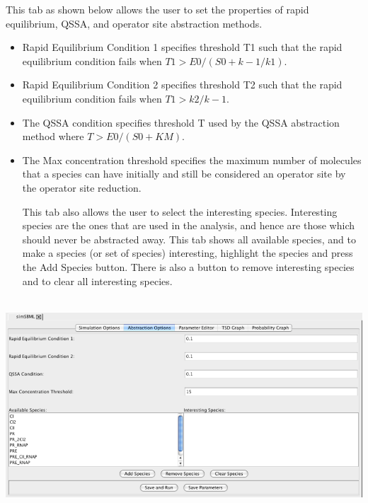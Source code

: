 \documentclass[titlepage,11pt]{article}
\begin{document}
\noindent
This tab as shown below allows the user to set the properties of rapid
equilibrium, QSSA, and operator site abstraction methods.
\begin{itemize}
\item Rapid Equilibrium Condition 1 specifies threshold T1 such that the rapid 
equilibrium condition fails when $T1 > E0 / (S0 + k-1/k1)$.
\item Rapid Equilibrium Condition 2 specifies threshold T2 such that the rapid 
equilibrium condition fails when $T1 > k2 /k-1$.
\item The QSSA condition specifies threshold T used by
the QSSA abstraction method where $T > E0 / (S0 + KM)$.
\item The Max concentration threshold specifies the maximum
number of molecules that a species can have initially and still
be considered an operator site by the operator site reduction. 

This tab also allows the user to select the interesting species.
Interesting species are the ones that are used in the
analysis, and hence are those which should never be abstracted away.
This tab shows all available species, and to make a species (or set of
species) interesting, highlight the species and press the Add Species
button.  There is also a button to remove interesting species and to clear
all interesting species. 

\end{itemize}
\begin{center}
\includegraphics[height=80mm]{screenshots/absOptions}
\end{center}
\end{document}

